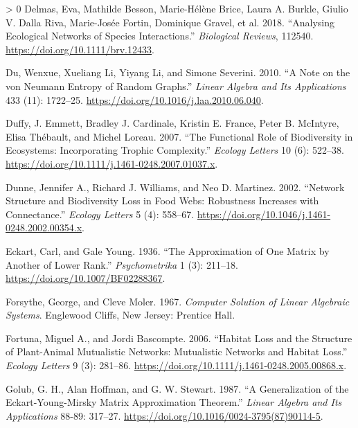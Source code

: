 \documentclass[11pt]{article}
\newlength{\cslhangindent}
\newenvironment{CSLReferences}[3] %
 {%
  \setlength{\parindent}{0pt}
  \ifodd #1 \everypar{\setlength{\hangindent}{\cslhangindent}}\ignorespaces\fi
  \ifnum #2 > 0
  \setlength{\parskip}{#2\baselineskip}
  \fi
 }%
 {}
\begin{document}
\begin{CSLReferences}{1}{0}
\leavevmode\hypertarget{ref-Delmas2018AnaEco}{}%
Delmas, Eva, Mathilde Besson, Marie-Hélène Brice, Laura A. Burkle,
Giulio V. Dalla Riva, Marie-Josée Fortin, Dominique Gravel, et al. 2018.
{``Analysing Ecological Networks of Species Interactions.''}
\emph{Biological Reviews}, 112540.
\url{https://doi.org/10.1111/brv.12433}.

\leavevmode\hypertarget{ref-Du2010NotNeu}{}%
Du, Wenxue, Xueliang Li, Yiyang Li, and Simone Severini. 2010. {``A Note
on the von Neumann Entropy of Random Graphs.''} \emph{Linear Algebra and
Its Applications} 433 (11): 1722--25.
\url{https://doi.org/10.1016/j.laa.2010.06.040}.

\leavevmode\hypertarget{ref-Duffy2007FunRol}{}%
Duffy, J. Emmett, Bradley J. Cardinale, Kristin E. France, Peter B.
McIntyre, Elisa Thébault, and Michel Loreau. 2007. {``The Functional
Role of Biodiversity in Ecosystems: Incorporating Trophic Complexity.''}
\emph{Ecology Letters} 10 (6): 522--38.
\url{https://doi.org/10.1111/j.1461-0248.2007.01037.x}.

\leavevmode\hypertarget{ref-Dunne2002NetStr}{}%
Dunne, Jennifer A., Richard J. Williams, and Neo D. Martinez. 2002.
{``Network Structure and Biodiversity Loss in Food Webs: Robustness
Increases with Connectance.''} \emph{Ecology Letters} 5 (4): 558--67.
\url{https://doi.org/10.1046/j.1461-0248.2002.00354.x}.

\leavevmode\hypertarget{ref-Eckart1936AppOne}{}%
Eckart, Carl, and Gale Young. 1936. {``The Approximation of One Matrix
by Another of Lower Rank.''} \emph{Psychometrika} 1 (3): 211--18.
\url{https://doi.org/10.1007/BF02288367}.

\leavevmode\hypertarget{ref-Forsythe1967ComSol}{}%
Forsythe, George, and Cleve Moler. 1967. \emph{Computer Solution of
Linear Algebraic Systems}. Englewood Cliffs, New Jersey: Prentice Hall.

\leavevmode\hypertarget{ref-Fortuna2006HabLos}{}%
Fortuna, Miguel A., and Jordi Bascompte. 2006. {``Habitat Loss and the
Structure of Plant-Animal Mutualistic Networks: Mutualistic Networks and
Habitat Loss.''} \emph{Ecology Letters} 9 (3): 281--86.
\url{https://doi.org/10.1111/j.1461-0248.2005.00868.x}.

\leavevmode\hypertarget{ref-Golub1987GenEck}{}%
Golub, G. H., Alan Hoffman, and G. W. Stewart. 1987. {``A Generalization
of the Eckart-Young-Mirsky Matrix Approximation Theorem.''} \emph{Linear
Algebra and Its Applications} 88-89: 317--27.
\url{https://doi.org/10.1016/0024-3795(87)90114-5}.


\end{CSLReferences}
\end{document}
